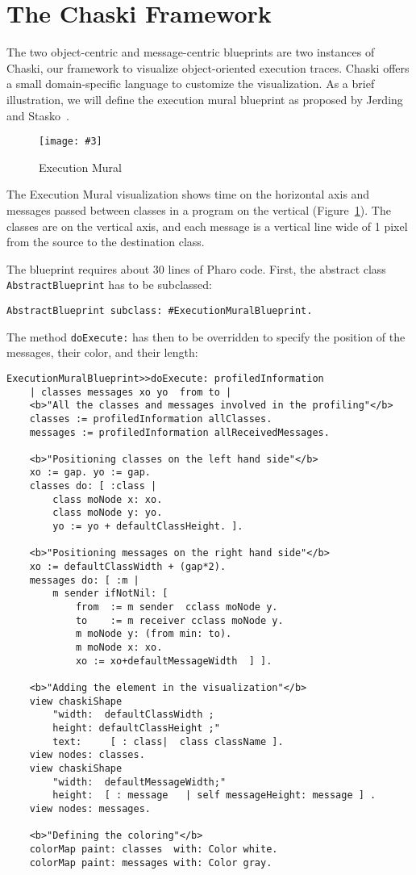 \documentclass[10pt, conference, compsocconf]{IEEEtran}
\newcommand{\ct}{\lstinline[backgroundcolor=\color{white},basicstyle=\footnotesize\ttfamily]}
\newcommand{\fig}[4]{
	\begin{figure}[#1]
		\centering
		\texttt{[image: \#3]}
		\caption{\label{fig:#3}#4}
	\end{figure}}
\newcommand{\seclabel}[1]{\label{sec:#1}}
\newcommand{\figref}[1]{Figure~\ref{fig:#1}}
\begin{document}


\section{The Chaski Framework}\seclabel{framework}

The two object-centric and message-centric blueprints are two instances of Chaski, our framework to visualize object-oriented execution traces. 
Chaski offers a small domain-specific language to customize the visualization. As a brief illustration, we will define the execution mural blueprint as proposed by Jerding and Stasko~\cite{Jerd98a}.

\fig{}{0.5}{ExecutionMuralDemo}{Execution Mural}

The Execution Mural visualization shows time on the horizontal axis and messages passed between classes in a program on the vertical (\figref{ExecutionMuralDemo}). The classes are on the vertical axis, and each message is a vertical line wide of 1 pixel from the source to the destination class.

The blueprint requires about 30 lines of Pharo code. First, the abstract class \ct{AbstractBlueprint} has to be subclassed:

\begin{lstlisting}[]
AbstractBlueprint subclass: #ExecutionMuralBlueprint.
\end{lstlisting}

The method \ct{doExecute:} has then to be overridden to specify the position of the messages, their color, and their length:

\begin{lstlisting}[]
ExecutionMuralBlueprint>>doExecute: profiledInformation
	| classes messages xo yo  from to |
	<b>"All the classes and messages involved in the profiling"</b>
	classes := profiledInformation allClasses.
	messages := profiledInformation allReceivedMessages.
	
	<b>"Positioning classes on the left hand side"</b>
	xo := gap. yo := gap.
	classes do: [ :class | 
		class moNode x: xo.   
		class moNode y: yo.
		yo := yo + defaultClassHeight. ].
		
	<b>"Positioning messages on the right hand side"</b>
	xo := defaultClassWidth + (gap*2).
	messages do: [ :m | 
		m sender ifNotNil: [
			from  := m sender  cclass moNode y.
			to    := m receiver cclass moNode y.
			m moNode y: (from min: to).
			m moNode x: xo.
			xo := xo+defaultMessageWidth  ] ].
	
	<b>"Adding the element in the visualization"</b>
	view chaskiShape 
		"width:  defaultClassWidth ;
		height: defaultClassHeight ;"
		text:     [ : class|  class className ].
	view nodes: classes.
	view chaskiShape 
		"width:  defaultMessageWidth;"
		height:  [ : message   | self messageHeight: message ] .
	view nodes: messages.
	
	<b>"Defining the coloring"</b>
	colorMap paint: classes  with: Color white.
	colorMap paint: messages with: Color gray.
\end{lstlisting}
\end{document}
